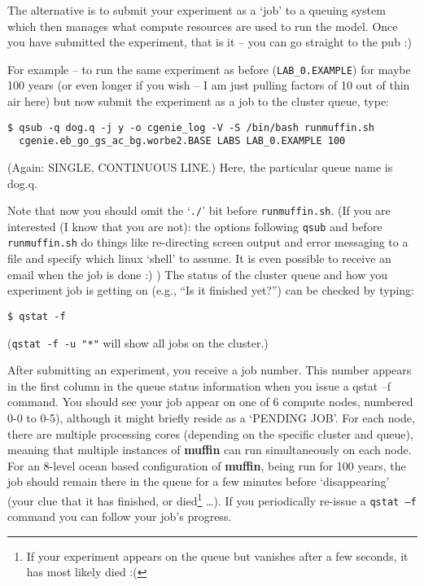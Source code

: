 \documentclass[11pt,fleqn]{book} %
\begin{document}
\noindent The alternative is to submit your experiment as a ‘job’ to a queuing system which then manages what compute resources are used to run the model. Once you have submitted the experiment, that is it – you can go straight to the pub :)

For example -- to run the same experiment as before (\texttt{LAB\_0.EXAMPLE}) for maybe 100 years (or even longer if you wish – I am just pulling factors of 10 out of thin air here) but now submit the experiment as a job to the cluster queue, type:
\vspace{-1mm}
\small\begin{verbatim}
$ qsub -q dog.q -j y -o cgenie_log -V -S /bin/bash runmuffin.sh
  cgenie.eb_go_gs_ac_bg.worbe2.BASE LABS LAB_0.EXAMPLE 100
\end{verbatim}\normalsize
\vspace{-1mm}

\noindent(Again: SINGLE, CONTINUOUS LINE.) Here, the particular queue name is \textsf{dog.q}.

Note that now you should omit the ‘\texttt{./}’ bit before \texttt{runmuffin.sh}.
(If you are interested (I know that you are not): the options following \texttt{qsub} and before \texttt{runmuffin.sh} do things like re-directing screen output and error messaging to a file and specify which linux ‘shell’ to assume. It is even possible to receive an email when the job is done :) )
The status of the cluster queue and how you experiment job is getting on (e.g., “Is it finished yet?”) can be checked by typing: 
\vspace{-1mm}
\small\begin{verbatim}
$ qstat -f
\end{verbatim}\normalsize
\vspace{-1mm}
(\texttt{qstat -f -u "*"} will show all jobs on the cluster.)

After submitting an experiment, you receive a job number. This number appears in the first column in the queue status information when you issue a qstat –f command. You should see your job appear on one of 6 compute nodes, numbered 0-0 to 0-5), although it might briefly reside as a ‘PENDING JOB’. For each node, there are multiple processing cores (depending on the specific cluster and queue), meaning that multiple instances of \textbf{muffin} can run simultaneously on each node. For an 8-level ocean based configuration of \textbf{muffin}, being run for 100 years, the job should remain there in the queue for a few minutes before ‘disappearing’ (your clue that it has finished, or died\footnote{If your experiment appears on the queue but vanishes after a few seconds, it has most likely died :(} …). If you periodically re-issue a \texttt{qstat –f} command you can follow your job’s progress.
\end{document}
